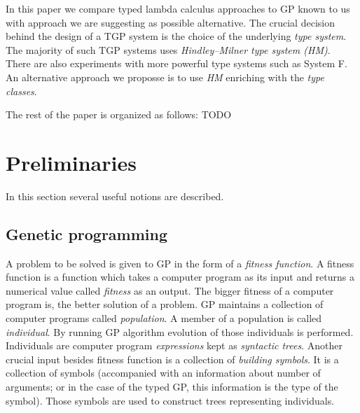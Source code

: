 \documentclass[11pt]{article}
\newcommand{\HM}{Hindley–Milner\xspace}
\newcommand{\red}[1]{{\color{red} #1}}
\begin{document}
\begin{article}





In this paper we compare typed lambda calculus approaches to GP known to us with approach we are suggesting as possible alternative. The crucial decision behind the design of a TGP system is the choice of the underlying \textit{type system}.
The majority of such TGP systems uses \textit{\HM type system (HM)}. There are also experiments with more powerful type systems such as System F. An alternative approach we proposse is to use \textit{HM} enriching with the \textit{type classes}.  

The rest of the paper is organized as follows: \red{TODO}

\section{Preliminaries}

In this section several useful notions 
are described.

\subsection{Genetic programming}

A problem to be solved is given to GP in the form of a \textit{fitness function}. A fitness function is a function which takes a computer program as its input and  returns a numerical value called \textit{fitness} as an output. The bigger fitness of a computer program is, the better solution of a problem.
GP maintains a collection of computer programs called \textit{population}.  A member of a population is called \textit{individual}. By running GP algorithm evolution of those individuals is performed. Individuals are computer program \textit{expressions} kept as \textit{syntactic trees}. Another crucial input besides fitness function is a collection of \textit{building symbols}. It is a collection of symbols (accompanied with an information about number of arguments; or in the case of the typed GP, this information is the type of the symbol). Those symbols are used to construct trees representing individuals.


\end{article}
\end{document}
